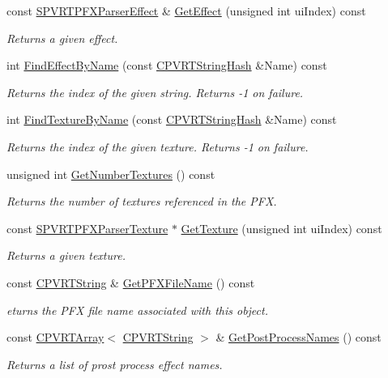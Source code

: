 \begin{DoxyCompactItemize}
const \hyperlink{struct_s_p_v_r_t_p_f_x_parser_effect}{S\+P\+V\+R\+T\+P\+F\+X\+Parser\+Effect} \& \hyperlink{class_c_p_v_r_t_p_f_x_parser_ac47b42eff3d3acfa04fa75a9dd0e0a73}{Get\+Effect} (unsigned int ui\+Index) const 
\begin{DoxyCompactList}\small\item\em Returns a given effect. \end{DoxyCompactList}\item 
int \hyperlink{class_c_p_v_r_t_p_f_x_parser_a72854ec3485e00894f5231bdb7aeb3f0}{Find\+Effect\+By\+Name} (const \hyperlink{class_c_p_v_r_t_string_hash}{C\+P\+V\+R\+T\+String\+Hash} \&Name) const 
\begin{DoxyCompactList}\small\item\em Returns the index of the given string. Returns -\/1 on failure. \end{DoxyCompactList}\item 
int \hyperlink{class_c_p_v_r_t_p_f_x_parser_a4ff1bd4beec702c2ea21500bdb9db9bf}{Find\+Texture\+By\+Name} (const \hyperlink{class_c_p_v_r_t_string_hash}{C\+P\+V\+R\+T\+String\+Hash} \&Name) const 
\begin{DoxyCompactList}\small\item\em Returns the index of the given texture. Returns -\/1 on failure. \end{DoxyCompactList}\item 
unsigned int \hyperlink{class_c_p_v_r_t_p_f_x_parser_ad26d3f66a6e6b4108b29a6c7d514598a}{Get\+Number\+Textures} () const 
\begin{DoxyCompactList}\small\item\em Returns the number of textures referenced in the P\+F\+X. \end{DoxyCompactList}\item 
const \hyperlink{struct_s_p_v_r_t_p_f_x_parser_texture}{S\+P\+V\+R\+T\+P\+F\+X\+Parser\+Texture} $\ast$ \hyperlink{class_c_p_v_r_t_p_f_x_parser_a71ba1aa445a178b276979dcd45fa9037}{Get\+Texture} (unsigned int ui\+Index) const 
\begin{DoxyCompactList}\small\item\em Returns a given texture. \end{DoxyCompactList}\item 
const \hyperlink{class_c_p_v_r_t_string}{C\+P\+V\+R\+T\+String} \& \hyperlink{class_c_p_v_r_t_p_f_x_parser_a99bab9bf37aa8123e9f7e27c728ac2b0}{Get\+P\+F\+X\+File\+Name} () const 
\begin{DoxyCompactList}\small\item\em eturns the P\+F\+X file name associated with this object. \end{DoxyCompactList}\item 
const \hyperlink{class_c_p_v_r_t_array}{C\+P\+V\+R\+T\+Array}$<$ \hyperlink{class_c_p_v_r_t_string}{C\+P\+V\+R\+T\+String} $>$ \& \hyperlink{class_c_p_v_r_t_p_f_x_parser_ae20159f761bf59bc8e5cf6d76fed1c10}{Get\+Post\+Process\+Names} () const 
\begin{DoxyCompactList}\small\item\em Returns a list of prost process effect names. \end{DoxyCompactList}\end{DoxyCompactItemize}
